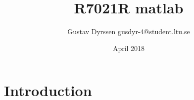 \documentclass{article}
\title{R7021R matlab}
\author{Gustav Dyrssen gusdyr-4@student.ltu.se}
\date{April 2018}
\begin{document}
\maketitle

\section{Introduction}
\end{document}
